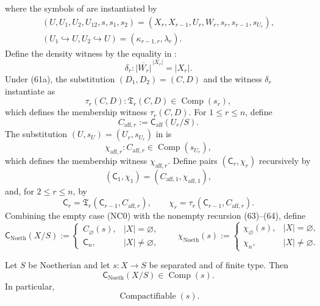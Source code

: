 \begin{definition}
\[  \]
  where the symbols of
   are instantiated by
  \[
  \begin{gathered}
    (U,U_1,U_2,U_{12},s,s_1,s_2)
      =(X_r,X_{r-1},U_r,W_r,s_r,s_{r-1},s_{U_r}),\\
    (U_1\hookrightarrow U,U_2\hookrightarrow U)
      =(\kappa_{r-1,r},\lambda_r).
  \end{gathered}                                                  \tag{61a}
  \]
  Define the density witness by the equality in
  :
  \[
    \delta_r\colon\overline{|W_r|}^{\,|X_r|}=|X_r|.              \tag{61b}
  \]
  Under (61a), the substitution $(D_1,D_2)=(C,D)$ and the witness
  $\delta_r$ instantiate  as
  \[
    \tau_r(C,D)\colon
      \mathfrak T_r(C,D)\in\operatorname{Comp}(s_r),              \tag{62}
  \]
  which defines the membership witness $\tau_r(C,D)$.
  For $1\leq r\leq n$, define
  \[
    C_{\mathrm{aff},r}:=\mathsf C_{\mathrm{aff}}(U_r/S).
  \]
  The substitution $(U,s_U)=(U_r,s_{U_r})$ in
   is
  \[
    \chi_{\mathrm{aff},r}\colon
      C_{\mathrm{aff},r}\in\operatorname{Comp}(s_{U_r}),        \tag{62a}
  \]
  which defines the membership witness $\chi_{\mathrm{aff},r}$.  Define pairs
  $(\mathsf C_r,\chi_r)$ recursively by
  \[
    (\mathsf C_1,\chi_1)
      =(C_{\mathrm{aff},1},\chi_{\mathrm{aff},1}),                 \tag{63}
  \]
  and, for $2\leq r\leq n$, by
  \[
    \mathsf C_r
      =\mathfrak T_r(\mathsf C_{r-1},C_{\mathrm{aff},r}),\qquad
    \chi_r
      =\tau_r(\mathsf C_{r-1},C_{\mathrm{aff},r}).                 \tag{64}
  \]
  Combining the empty case (NC0) with the nonempty recursion (63)--(64),
  define
  \[
    \mathsf C_{\mathrm{Noeth}}(X/S):=
    \begin{cases}
      C_\varnothing(s),&|X|=\varnothing,\\
      \mathsf C_n,&|X|\neq\varnothing,
    \end{cases}
    \qquad
    \chi_{\mathrm{Noeth}}(s):=
    \begin{cases}
      \chi_\varnothing(s),&|X|=\varnothing,\\
      \chi_n,&|X|\neq\varnothing.
    \end{cases}                                                    \tag{65}
  \]
\end{definition}

\begin{theorem}
  \label{thm:nagata-noetherian}
  \lean{}

  Let $S$ be Noetherian and let $s\colon X\to S$ be separated and of finite
  type.  Then
  \[
    \mathsf C_{\mathrm{Noeth}}(X/S)
      \in\operatorname{Comp}(s).
  \]
  In particular,
  \[
    \operatorname{Compactifiable}(s).
  \]
\end{theorem}


